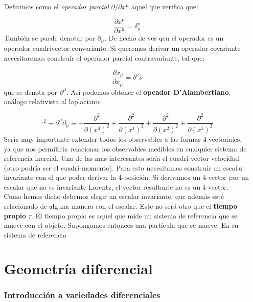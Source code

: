 \documentclass[12pt,a4paper]{book}
\numberwithin{equation}{section}
\numberwithin{figure}{section}
\newcommand{\parciales}[2]{\frac{\partial #1}{\partial #2}}
\begin{document}
Definimos como el \textit{operador parcial} $\partial / \partial x^{\mu}$ aquel que verifica que:

\begin{equation}
\parciales{x^{\nu}}{x^{\mu}} = \delta_{\mu}^{\nu}
\end{equation}
También se puede denotar por $\partial_\mu$. De hecho de ves qeu el operador es un operador cuadrivector convariante. Si queremos derivar un operador covariante necesitaremos construir el operador parcial contravariante, tal que:

\begin{equation}
\parciales{x_{\nu}}{x_{\mu}} = \delta^{\mu}{\nu}
\end{equation}
que se denota por $\partial^{\mu}$. Así podemos obtener el \textbf{opeador D'Alambertiano}, análogo relativista al laplaciano:

\begin{equation}
\square^2 \equiv \partial^\mu \partial_\mu \equiv - \parciales{^2}{(x^0)^2} + \parciales{^2}{(x^1)^2} + \parciales{^2}{(x^2)^2}  + \parciales{^2}{(x^3)^2} 
\end{equation}
Sería muy importante extender todos los observables a las formas 4-vectoriales, ya que nos permitiría relacionar los observables medibles en cualquier sistema de referencia inercial. Una de las mas interesantes sería el cuadri-vector velocidad (otro podría ser el cuadri-momento). Para esto necesitamos construir un escalar invariante con el que poder derivar la 4-posición. Si derivamos un 4-vector por un escalar que no es invariante Lorentz, el vector resultante no es un 4-vector. \\

Como hemos dicho debemos elegir un escalar invariante, que además esté relacionado de alguna manera con el escalar. Este no será otro que el \textbf{tiempo propio} $\tau$. El tiempo propio es aquel que mide un sistema de referencia que se mueve con el objeto. Supongamos entonces una partícula que se mueve. En su sistema de referencia

\newpage

\chapter{Geometría diferencial}

\subsection{Introducción a variedades diferenciales}
\end{document}
